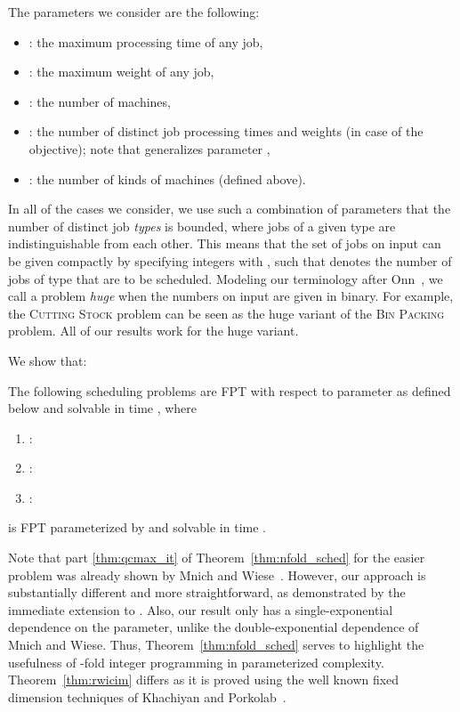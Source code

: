 \documentclass{llncs}
\newcommand{\FPT}{{\sf FPT}\xspace}
\begin{document}
The parameters we consider are the following:
\begin{itemize}
\item : the maximum processing time of any job,
\item : the maximum weight of any job,
\item : the number of machines,
\item : the number of distinct job processing times and weights (in case of the  objective); note that  generalizes parameter ,
\item : the number of kinds of machines (defined above).
\end{itemize}

In all of the cases we consider, we use such a combination of parameters that the number  of distinct job \textit{types} is bounded, where jobs of a given type are indistinguishable from each other. This means that the set of jobs  on input can be given compactly by specifying integers  with , such that  denotes the number of jobs of type  that are to be scheduled. Modeling our terminology after Onn~\cite{OnnS:15}, we call a problem \textit{huge} when the numbers  on input are given in binary. For example, the \textsc{Cutting Stock} problem can be seen as the huge variant of the \textsc{Bin Packing} problem. All of our results work for the huge variant. 

We show that:



\begin{theorem}\label{thm:nfold_sched}
The following scheduling problems are \FPT with respect to parameter  as defined below and solvable in time , where 
\begin{enumerate}
\item :  \label{thm:qcmax_it}
\item :  \label{thm:rcmax_it}
\item :  \label{thm:rwici_it}
\end{enumerate}
\end{theorem}


\begin{theorem}\label{thm:rwicim}
 is \FPT parameterized by  and solvable in time .
\end{theorem}

Note that part \eqref{thm:qcmax_it} of Theorem~\ref{thm:nfold_sched} for the easier  problem was already shown by Mnich and Wiese~\cite{MnichW:14}. However, our approach is substantially different and more straightforward, as demonstrated by the immediate extension to . Also, our result only has a single-exponential dependence on the parameter, unlike the double-exponential dependence of Mnich and Wiese. Thus, Theorem~\ref{thm:nfold_sched} serves to highlight the usefulness of -fold integer programming in parameterized complexity. Theorem~\ref{thm:rwicim} differs as it is proved using the well known fixed dimension techniques of Khachiyan and Porkolab~\cite{KhachiyanP:00}.
\end{document}
